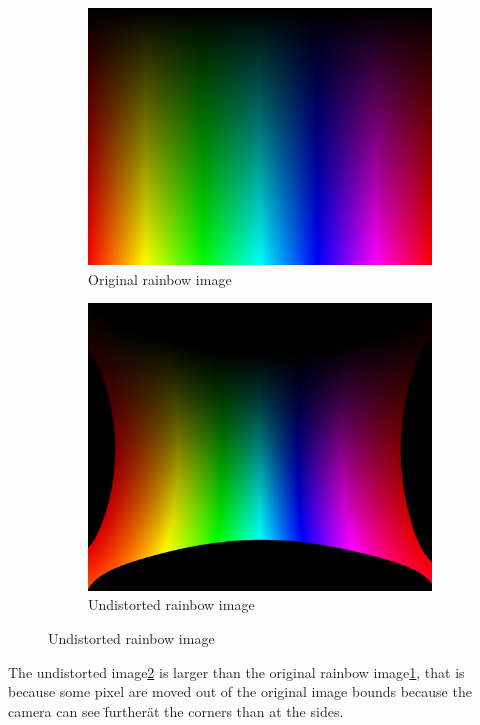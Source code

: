 \begin{figure}[H]
    \centering
    \begin{subfigure}{.5\textwidth}
        \centering
        \includegraphics[width=.8\textwidth]{../photos/original_rainbow}
        \caption[originalRainbow]{Original rainbow image}
        \label{fig:original_rainbow}
    \end{subfigure}%
    \begin{subfigure}{.5\textwidth}
        \centering
        \includegraphics[width=.8\textwidth]{../photos/undistorted_rainbow}
        \caption[originalRainbow]{Undistorted rainbow image}
        \label{fig:undistorted_rainbow}
    \end{subfigure}
    \caption{Undistorted rainbow image}
    \label{fig:original_undistorted_rainbow}
\end{figure}
The undistorted image\ref{fig:undistorted_rainbow} is larger than the original rainbow image\ref{fig:original_rainbow}, that is because some pixel are moved out of the original image bounds because the camera can see \"further\" at the corners than at the sides.
